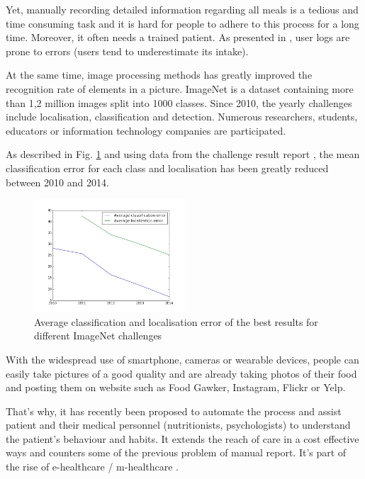Yet, manually recording detailed information regarding all meals is a tedious and time consuming task and it is hard for people to adhere to this process for a long time. Moreover, it often needs a trained patient. As presented in \cite{Lichtman1992}, user logs are prone to errors (users tend to underestimate its intake).

At the same time, image processing methods has greatly improved the recognition rate of elements in a picture. ImageNet is a dataset containing more than 1,2 million images split into 1000 classes. Since 2010, the yearly challenges include localisation, classification and detection. Numerous researchers, students, educators or information technology companies are participated.

As described in Fig. \ref{fig:imagenet_results} and using data from the challenge result report \cite{Russakovsky2015}, the mean classification error for each class and localisation has been greatly reduced between 2010 and 2014.

\begin{figure}[h]
    \centering
    \includegraphics[width=0.5\textwidth,  height=0.455\textwidth ]{img/imagenet}
    \caption{Average classification and localisation error of the best results for different ImageNet challenges}
    \label{fig:imagenet_results}
\end{figure}

With the widespread use of smartphone, cameras or wearable devices, people can easily take pictures of a good quality and are already taking photos of their food and posting them on website such as Food Gawker, Instagram, Flickr or Yelp.

That's why, it has recently been proposed to automate the process and assist patient and their medical personnel (nutritionists, psychologists) to understand the patient's behaviour and habits. It extends the reach of care in a cost effective ways and counters some of the previous problem of manual report. It's part of the rise of e-healthcare / m-healthcare \cite{Hillestad2005, Menachemi2011}.

